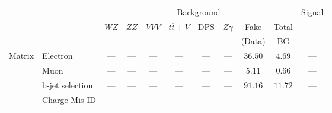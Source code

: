 \small\renewcommand{\tabcolsep}{4pt}
\begin{tabular}{|cl||ccccccc|c||c|}
\hline
 & & \multicolumn{8}{c||}{Background} & Signal\\ 
 & & $WZ$ & $ZZ$ & $VVV$ & $t\overline{t}+V$ & DPS & $Z\gamma$ & Fake & Total & \\ 
 & & &  &  &  &  &  & (Data) & BG & \\ 
\hline\hline
\multirow{2}{*}{Matrix}
& Electron &  --- &  --- &  --- &  --- &  --- &  --- & $36.50$& $4.69$&  ---\\ 
\cline{2-11}
\multirow{2}{*}{Method}
& Muon &  --- &  --- &  --- &  --- &  --- &  --- & $5.11$& $0.66$&  ---\\ 
\cline{2-11}
& b-jet selection &  --- &  --- &  --- &  --- &  --- &  --- & $91.16$& $11.72$&  ---\\ 
\hline
&Charge Mis-ID & --- & --- & --- & --- & --- & --- & --- & --- & ---\\ 
\hline
\end{tabular}
